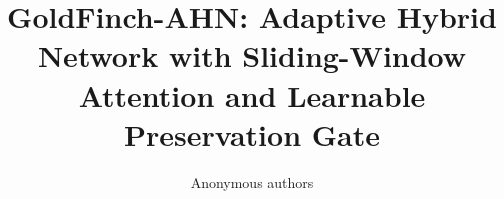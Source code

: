 \title{\textbf{GoldFinch-AHN: Adaptive Hybrid Network with Sliding-Window Attention and Learnable Preservation Gate}}

\author{Anonymous authors}
